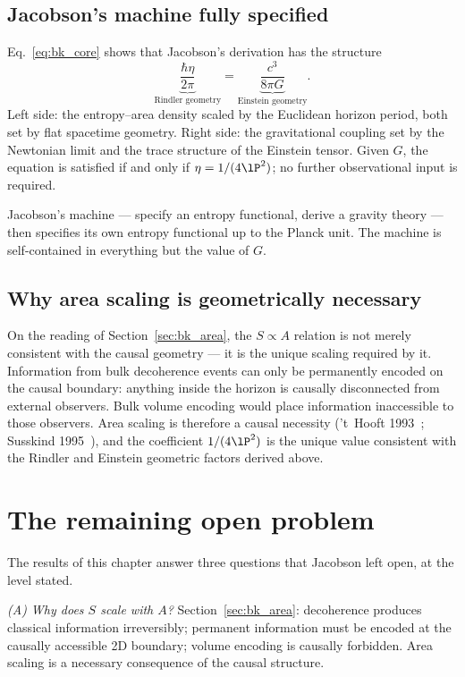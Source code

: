 \subsection{Jacobson's machine fully specified}
Eq.~\eqref{eq:bk_core} shows that Jacobson's derivation has the structure
\begin{equation}
\underbrace{\frac{\hbar\eta}{2\pi}}_{\text{Rindler geometry}}=\underbrace{\frac{c^3}{8\pi G}}_{\text{Einstein geometry}}.\label{eq:bk_structure}
\end{equation}
Left side: the entropy--area density scaled by the Euclidean horizon period, both set by flat spacetime geometry. Right side: the gravitational coupling set
by the Newtonian limit and the trace structure of the Einstein tensor. Given $G$, the equation is satisfied if and only if $\eta=1/(4\lP^2)$; no further
observational input is required.

Jacobson's machine --- specify an entropy functional, derive a gravity theory --- then specifies its own entropy functional up to the Planck unit. The
machine is self-contained in everything but the value of $G$. \derived

\subsection{Why area scaling is geometrically necessary}
On the reading of Section~\ref{sec:bk_area}, the $S\propto A$ relation is not merely consistent with the causal geometry --- it is the unique scaling required by it.
Information from bulk decoherence events can only be permanently encoded on the causal boundary: anything inside the horizon is causally disconnected from
external observers. Bulk volume encoding would place information inaccessible to those observers. Area scaling is therefore a causal necessity
('t~Hooft 1993~\cite{tHooft1993}; Susskind 1995~\cite{Susskind1995}), and the coefficient $1/(4\lP^2)$ is the unique value consistent with the Rindler and Einstein
geometric factors derived above. \interp

\section{The remaining open problem}\label{sec:bk_open}
The results of this chapter answer three questions that Jacobson left open, at the level stated.

\emph{(A) Why does $S$ scale with $A$?} Section~\ref{sec:bk_area}: decoherence produces classical information irreversibly; permanent information must be
encoded at the causally accessible 2D boundary; volume encoding is causally forbidden. Area scaling is a necessary consequence of the causal structure.
\interp


